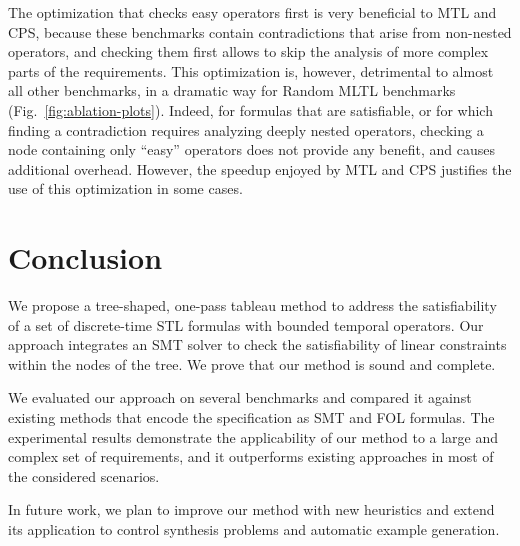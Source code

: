 \documentclass[acmsmall,screen]{acmart}
\begin{document}
The optimization that checks easy operators first is very beneficial to MTL and CPS,
because these benchmarks contain contradictions that arise from non-nested operators,
and checking them first allows to skip the analysis of more complex parts of the requirements.
This optimization is, however, detrimental to almost all other benchmarks,
in a dramatic way for Random MLTL benchmarks (Fig.~\ref{fig:ablation-plots}).
Indeed, for formulas that are satisfiable, or for which finding a contradiction requires analyzing deeply nested operators,
checking a node containing only ``easy'' operators does not provide any benefit,
and causes additional overhead.
However, the speedup enjoyed by MTL and CPS justifies the use of this optimization in some cases.
\color{black}

\section{Conclusion}
We propose a tree-shaped, one-pass tableau method to address the satisfiability of a set of discrete-time STL formulas with bounded temporal operators.  Our approach integrates an SMT solver to check the satisfiability of linear constraints within the nodes of the tree.  We prove that our method is sound and complete.  

We evaluated our approach on several benchmarks and compared it against existing methods that encode the specification as SMT and FOL formulas. The experimental results demonstrate the applicability of our method to a large and complex set of requirements, and it outperforms existing approaches in most of the considered scenarios. 

In future work, we plan to improve our method with new heuristics and extend its application to control synthesis problems and automatic example generation.


\end{document}
